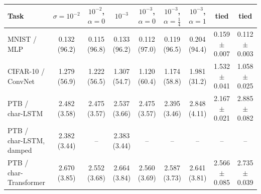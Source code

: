 \begin{tabular}{l cccccc cc}
\toprule
Task & $\sigma{=}10^{-2}$ & $10^{-2}$, $\alpha{=}0$ & $10^{-3}$ & $10^{-3}$, $\alpha{=}0$ & $10^{-3}$, $\alpha{=}\frac14$ & $10^{-3}$, $\alpha{=}1$ & \ANPb{} tied & \ANP{} tied \\
\midrule
MNIST / MLP & 0.132 (96.2) & 0.115 (96.8) & 0.133 (96.2) & 0.112 (97.0) & 0.119 (96.5) & 0.204 (94.4) & 0.159$\pm$0.007 & 0.112$\pm$0.003 \\
CIFAR-10 / ConvNet & 1.279 (56.9) & 1.222 (56.5) & 1.307 (54.7) & 1.120 (60.4) & 1.174 (58.8) & 1.981 (31.2) & 1.532$\pm$0.041 & 1.058$\pm$0.025 \\
PTB / char-LSTM & 2.482 (3.58) & 2.475 (3.57) & 2.537 (3.66) & 2.475 (3.57) & 2.395 (3.46) & 2.848 (4.11) & 2.167$\pm$0.021 & 2.885$\pm$0.082 \\
PTB / char-LSTM, damped & 2.382 (3.44) & -- & 2.383 (3.44) & -- & -- & -- & -- & -- \\
PTB / char-Transformer & 2.670 (3.85) & 2.552 (3.68) & 2.664 (3.84) & 2.560 (3.69) & 2.587 (3.73) & 2.641 (3.81) & 2.566$\pm$0.085 & 2.735$\pm$0.039 \\
\bottomrule
\end{tabular}

